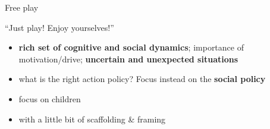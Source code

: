 \documentclass[compress]{beamer}
\begin{document}
\begin{frame}{Free play}

    \begin{center}
    {\Large ``Just play! Enjoy yourselves!''}
    \end{center}

    \vspace{3em}

    \begin{itemize}
        \item \textbf{rich set of cognitive and
            social dynamics}; importance of motivation/drive; \textbf{uncertain
            and unexpected situations}
        \item what is the right action policy? Focus instead on the \textbf{social policy}
    \end{itemize}
    \pause
    \begin{itemize}
        \item focus on children
        \item with a little bit of scaffolding \& framing
    \end{itemize}


\end{frame}
%
%
%
%
%
\end{document}
